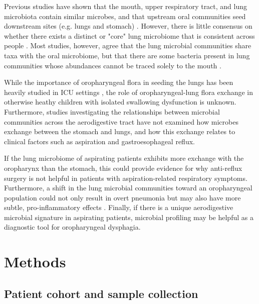 Previous studies have shown that the mouth, upper respiratory tract, and lung microbiota contain similar microbes, and that upstream oral communities seed downstream sites (e.g. lungs and stomach) \cite{Bassis2015source,Charlson2011topographical,rosen2015ppi}.
However, there is little consensus on whether there exists a distinct or "core" lung microbiome that is consistent across people \cite{Charlson2011topographical,venkataraman-2015-dispersal,segal-2013-pneumotypes,erbDownward-2011-COPD}.
Most studies, however, agree that the lung microbial communities share taxa with the oral microbiome, but that there are some bacteria present in lung communities whose abundances cannot be traced solely to the mouth \cite{Charlson2011topographical,Bassis2015source,morris-2013-healthsmokers,segal-2013-pneumotypes}.

While the importance of oropharyngeal flora in seeding the lungs has been heavily studied in ICU settings \cite{tantipong2008decontamination,koeman2006decontamination,hu2010pseudo}, the role of oropharyngeal-lung flora exchange in otherwise heathy children with isolated swallowing dysfunction is unknown.
Furthermore, studies investigating the relationships between microbial communities across the aerodigestive tract have not examined how microbes exchange between the stomach and lungs, and how this exchange relates to clinical factors such as aspiration and gastroesophageal reflux.

If the lung microbiome of aspirating patients exhibits more exchange with the oropharynx than the stomach, this could provide evidence for why anti-reflux surgery is not helpful in patients with aspiration-related respiratory symptoms.
Furthermore, a shift in the lung microbial communities toward an oropharyngeal population could not only result in overt pneumonia but may also have more subtle, pro-inflammatory effects \cite{segal-2016-inflammation}.
Finally, if there is a unique aerodigestive microbial signature in aspirating patients, microbial profiling may be helpful as a diagnostic tool for oropharyngeal dysphagia.

\section{Methods}

\subsection{Patient cohort and sample collection}

